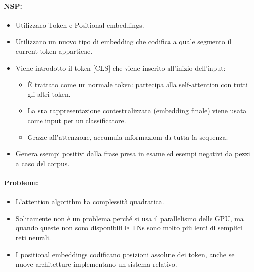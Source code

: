 
\paragraph{NSP:}

\begin{itemize}
  \item Utilizzano Token e Positional embeddings. 
  \item Utilizzano un nuovo tipo di embedding che codifica a quale segmento il current token appartiene. 
  \item Viene introdotto il token $[$CLS$]$ che viene inserito all'inizio dell'input: 
     \begin{itemize}
    \item È trattato come un normale token: partecipa alla self-attention con tutti gli altri token.
    \item La sua rappresentazione contestualizzata (embedding finale) viene usata come input per un classificatore.
    \item Grazie all’attenzione,  accumula informazioni da tutta la sequenza.
  \end{itemize}
\item Genera esempi positivi dalla frase presa in esame ed esempi negativi da pezzi a caso del corpus. 
\end{itemize}


\paragraph{Problemi:}

\begin{itemize}
  \item L'attention algorithm ha complessità quadratica. 
  \item Solitamente non è un problema perché si usa il parallelismo delle GPU, ma quando queste non sono disponibili le TNs sono molto più lenti di semplici reti neurali. 
  \item I positional embeddings codificano posizioni assolute dei token, anche se nuove architetture implementano un sistema relativo.
\end{itemize}
